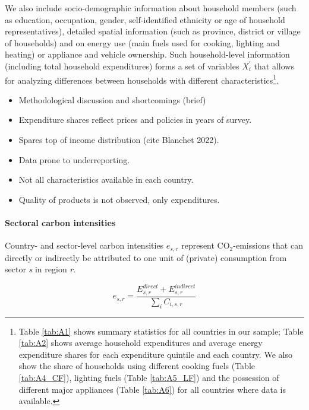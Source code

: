 \documentclass[12pt, a4paper]{article}
\begin{document}
We also include socio-demographic information about household members (such as education, occupation, gender, self-identified ethnicity or age of household representatives), detailed spatial information (such as province, district or village of households) and on energy use (main fuels used for cooking, lighting and heating) or appliance and vehicle ownership. Such household-level information (including total household expenditures) forms a set of variables $X_{i}^{'}$ that allows for analyzing differences between households with different characteristics\footnote{Table \ref{tab:A1} shows summary statistics for all countries in our sample; Table \ref{tab:A2} shows average household expenditures and average energy expenditure shares for each expenditure quintile and each country. We also show the share of households using different cooking fuels (Table \ref{tab:A4_CF}), lighting fuels (Table \ref{tab:A5_LF}) and the possession of different major appliances (Table \ref{tab:A6}) for all countries where data is available.}. 

\begin{itemize}
    \item Methodological discussion and shortcomings (brief)
    \item Expenditure shares reflect prices and policies in years of survey. 
    \item Spares top of income distribution (cite Blanchet 2022).
    \item Data prone to underreporting.
    \item Not all characteristics available in each country.
    \item Quality of products is not observed, only expenditures. 
\end{itemize}


\paragraph{Sectoral carbon intensities} Country- and sector-level carbon intensities $e_{s,r}$ represent CO$_{2}$-emissions that can directly or indirectly be attributed to one unit of (private) consumption from sector \textit{s} in region \textit{r}.

\begin{equation}
    e_{s,r} = \frac{E_{s,r}^{direct}+E_{s,r}^{indirect}}{\sum_{i} C_{i,s,r}}
\end{equation}
\end{document}
